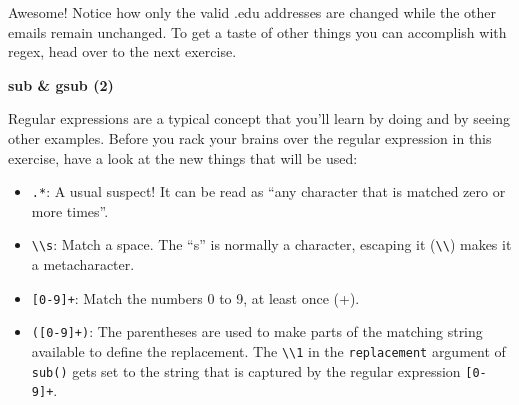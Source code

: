 \documentclass[]{article}
\providecommand{\tightlist}{%
  \setlength{\itemsep}{0pt}\setlength{\parskip}{0pt}}
\newcommand{\hlnum}[1]{\textcolor[rgb]{0.816,0.125,0.439}{#1}}%
\newcommand{\hlstr}[1]{\textcolor[rgb]{0.251,0.627,0.251}{#1}}%
\newcommand{\hlcom}[1]{\textcolor[rgb]{0.502,0.502,0.502}{\textit{#1}}}%
\newcommand{\hlstd}[1]{\textcolor[rgb]{0.251,0.251,0.251}{#1}}%
\newcommand{\hlkwc}[1]{\textcolor[rgb]{0.251,0.251,0.251}{#1}}%
\newcommand{\hlkwd}[1]{\textcolor[rgb]{0.878,0.439,0.125}{#1}}%
\newenvironment{Shaded}{\begin{myshaded}}{\end{myshaded}}
\newcommand{\KeywordTok}[1]{\hlkwd{#1}}
\newcommand{\DataTypeTok}[1]{\hlkwc{#1}}
\newcommand{\DecValTok}[1]{\hlnum{#1}}
\newcommand{\CharTok}[1]{\hlstr{#1}}
\newcommand{\StringTok}[1]{\hlstr{#1}}
\newcommand{\CommentTok}[1]{\hlcom{#1}}
\newcommand{\NormalTok}[1]{\hlstd{#1}}
\begin{document}
\begin{Shaded}
\end{Shaded}

Awesome! Notice how only the valid .edu addresses are changed while the
other emails remain unchanged. To get a taste of other things you can
accomplish with regex, head over to the next exercise.

\textbf{sub \& gsub (2)}

Regular expressions are a typical concept that you'll learn by doing and
by seeing other examples. Before you rack your brains over the regular
expression in this exercise, have a look at the new things that will be
used:

\begin{itemize}
\tightlist
\item
  \texttt{.*}: A usual suspect! It can be read as ``any character that
  is matched zero or more times''.
\item
  \texttt{\textbackslash{}\textbackslash{}s}: Match a space. The ``s''
  is normally a character, escaping it
  (\texttt{\textbackslash{}\textbackslash{}}) makes it a metacharacter.
\item
  \texttt{{[}0-9{]}+}: Match the numbers 0 to 9, at least once (+).
\item
  \texttt{({[}0-9{]}+)}: The parentheses are used to make parts of the
  matching string available to define the replacement. The
  \texttt{\textbackslash{}\textbackslash{}1} in the \texttt{replacement}
  argument of \texttt{sub()} gets set to the string that is captured by
  the regular expression \texttt{{[}0-9{]}+}.
\end{itemize}
\end{document}
